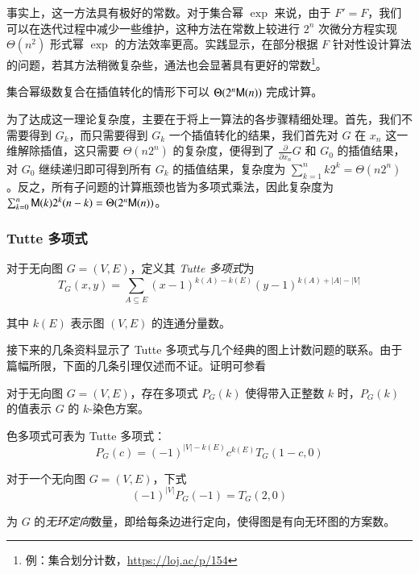 事实上，这一方法具有极好的常数。对于集合幂 $\exp$ 来说，由于 $F'=F$，我们可以在迭代过程中减少一些维护，这种方法在常数上较进行 $2^n$ 次微分方程实现 $\Theta(n^2)$ 形式幂 $\exp$ 的方法效率更高。实践显示，在部分根据 $F$ 针对性设计算法的问题，若其方法稍微复杂些，通法也会显著具有更好的常数\footnote{例：集合划分计数，\url{https://loj.ac/p/154}}。

\begin{lemma}
集合幂级数复合在插值转化的情形下可以 $\Theta(2^n\mathsf M(n))$ 完成计算。
\end{lemma}

为了达成这一理论复杂度，主要在于将上一算法的各步骤精细处理。首先，我们不需要得到 $G_k$，而只需要得到 $G_k$ 一个插值转化的结果，我们首先对 $G$ 在 $x_n$ 这一维解除插值，这只需要 $\Theta(n2^n)$ 的复杂度，便得到了 $\frac{\partial}{\partial x_n} G$ 和 $G_0$ 的插值结果，对 $G_0$ 继续递归即可得到所有 $G_k$ 的插值结果，复杂度为 $\sum_{k=1}^n k2^k = \Theta(n2^n)$。反之，所有子问题的计算瓶颈也皆为多项式乘法，因此复杂度为 $\sum_{k=0}^n \mathsf M(k) 2^k(n-k) = \Theta(2^n\mathsf M(n))$。

\subsubsection{Tutte 多项式}

\begin{definition}
对于无向图 $G = (V, E)$，定义其 \emph{Tutte 多项式}为
$$T_G(x,y)=\sum_{A\subseteq E}(x-1)^{k(A)-k(E)}(y-1)^{k(A)+|A|-|V|}$$

其中 $k(E)$ 表示图 $(V, E)$ 的连通分量数。
\end{definition}

接下来的几条资料显示了 Tutte 多项式与几个经典的图上计数问题的联系。由于篇幅所限，下面的几条引理仅述而不证。证明可参看 \cite[X.4]{graph}

\begin{definition}[色多项式]
对于无向图 $G = (V, E)$，存在多项式 $P_G(k)$ 使得带入正整数 $k$ 时，$P_G(k)$ 的值表示 $G$ 的 $k$-染色方案。
\end{definition}

\begin{lemma}
色多项式可表为 Tutte 多项式：
$$P_G(c)=(-1)^{|V|-k(E)}c^{k(E)}T_G(1-c, 0)$$
\end{lemma}

\begin{lemma}
对于一个无向图 $G = (V, E)$，下式
$$(-1)^{|V|}P_G(-1)=T_G(2,0)$$

为 $G$ 的\emph{无环定向}数量，即给每条边进行定向，使得图是有向无环图的方案数。
\end{lemma}

